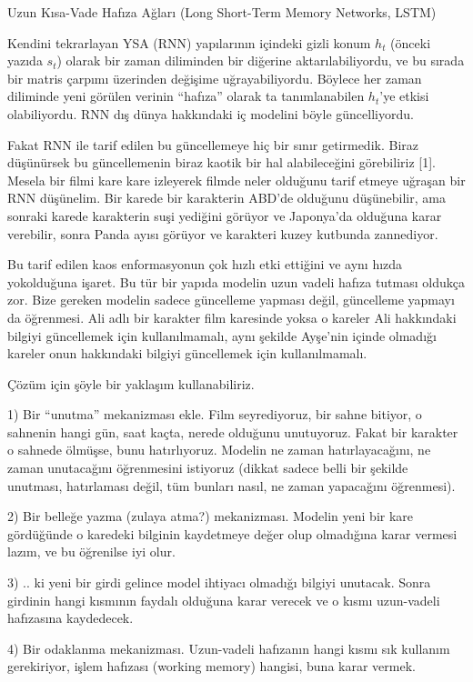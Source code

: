 \documentclass[12pt,fleqn]{article}\usepackage{../../common}
\begin{document}
Uzun Kısa-Vade Hafıza Ağları (Long Short-Term Memory Networks, LSTM)

Kendini tekrarlayan YSA (RNN) yapılarının içindeki gizli konum $h_t$
(önceki yazıda $s_t$) olarak bir zaman diliminden bir diğerine
aktarılabiliyordu, ve bu sırada bir matris çarpımı üzerinden değişime
uğrayabiliyordu. Böylece her zaman diliminde yeni görülen verinin
``hafıza'' olarak ta tanımlanabilen $h_t$'ye etkisi olabiliyordu. RNN dış
dünya hakkındaki iç modelini böyle güncelliyordu.

Fakat RNN ile tarif edilen bu güncellemeye hiç bir sınır getirmedik. Biraz
düşünürsek bu güncellemenin biraz kaotik bir hal alabileceğini görebiliriz
[1]. Mesela bir filmi kare kare izleyerek filmde neler olduğunu tarif
etmeye uğraşan bir RNN düşünelim. Bir karede bir karakterin ABD'de olduğunu
düşünebilir, ama sonraki karede karakterin suşi yediğini görüyor ve
Japonya'da olduğuna karar verebilir, sonra Panda ayısı görüyor ve karakteri
kuzey kutbunda zannediyor.

Bu tarif edilen kaos enformasyonun çok hızlı etki ettiğini ve aynı hızda
yokolduğuna işaret. Bu tür bir yapıda modelin uzun vadeli hafıza tutması
oldukça zor. Bize gereken modelin sadece güncelleme yapması değil,
güncelleme yapmayı da öğrenmesi. Ali adlı bir karakter film karesinde yoksa
o kareler Ali hakkındaki bilgiyi güncellemek için kullanılmamalı, aynı
şekilde Ayşe'nin içinde olmadığı kareler onun hakkındaki bilgiyi
güncellemek için kullanılmamalı. 

Çözüm için şöyle bir yaklaşım kullanabiliriz. 

1) Bir ``unutma'' mekanizması ekle. Film seyrediyoruz, bir sahne bitiyor, o
sahnenin hangi gün, saat kaçta, nerede olduğunu unutuyoruz. Fakat bir
karakter o sahnede ölmüşse, bunu hatırlıyoruz. Modelin ne zaman
hatırlayacağını, ne zaman unutacağını öğrenmesini istiyoruz (dikkat sadece
belli bir şekilde unutması, hatırlaması değil, tüm bunları nasıl, ne zaman
yapacağını öğrenmesi).

2) Bir belleğe yazma (zulaya atma?) mekanizması. Modelin yeni bir kare
gördüğünde o karedeki bilginin kaydetmeye değer olup olmadığına karar
vermesi lazım, ve bu öğrenilse iyi olur.

3) .. ki yeni bir girdi gelince model ihtiyacı olmadığı bilgiyi
unutacak. Sonra girdinin hangi kısmının faydalı olduğuna karar verecek ve o
kısmı uzun-vadeli hafızasına kaydedecek.

4) Bir odaklanma mekanizması. Uzun-vadeli hafızanın hangi kısmı sık
kullanım gerekiriyor, işlem hafızası (working memory) hangisi, buna karar
vermek.
\end{document}
